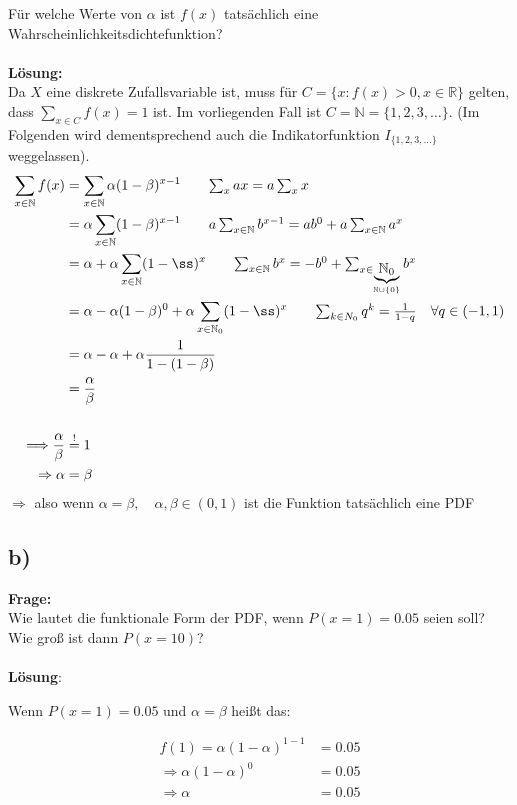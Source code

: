 \documentclass{article}
\begin{document}
Für welche Werte von $\alpha$ ist $f(x)$ tatsächlich eine Wahrscheinlichkeitsdichtefunktion?\\ \\
\textbf{Lösung:} \\

Da $X$ eine diskrete Zufallsvariable ist, muss für $C = \{x: f(x) > 0, x \in \mathbb{R}\}$ gelten, dass $\sum_{x \in C}f(x) = 1$ ist. Im vorliegenden Fall ist $C = \mathbb{N} = \{1,2,3, \ldots\}$. (Im Folgenden wird dementsprechend auch die Indikatorfunktion $I_{\{1,2,3,...\}}$ weggelassen).
\begin{align*}
    \sum_{x \in \mathbb{N}} f(x) &= \sum_{x \in \mathbb{N}}\alpha (1-\beta)^{x-1} \tag*{$\sum_{x} ax = a \sum_{x}x$} \\
    &= \alpha \sum_{x \in \mathbb{N}} (1-\beta)^{x-1} \tag*{$a\sum_{x \in \mathbb{N}}b^{x-1}= ab^{0} + a\sum_{x \in \mathbb{N}}a^{x}$} \\
    &= \alpha + \alpha \sum_{x \in \mathbb{N}}(1-ß)^{x} \tag*{$\sum_{x \in \mathbb{N}} b^{x} = -b^{0} +\sum_{x \in \underbrace{\mathbb{N}_{0}}_{\mathbb{N}\cup \{ 0 \}}} b^{x}$}  \\
    &= \alpha - \alpha(1-\beta)^{0} + \alpha \sum_{x \in \mathbb{N}_{0}}(1-ß)^{x} \tag*{$\sum_{k \in N_{0}} q^{k} = \frac{1}{1-q}\quad \forall q \in (-1, 1)$} \\
    &= \alpha - \alpha  + \alpha \frac{1}{1- ( 1 - \beta)} \\
    &= \frac{\alpha}{\beta} \\ \\
    \Longrightarrow \frac{\alpha}{\beta} &\overset{!}{=} 1 \\
    \Rightarrow \alpha &= \beta 
\end{align*}
$\Longrightarrow$ also wenn $\alpha = \beta, \quad \alpha, \beta \in (0,1)$ ist die Funktion tatsächlich eine PDF 

\subsection*{b)}
\textbf{Frage:}\\

Wie lautet die funktionale Form der PDF, wenn $P(x=1)=0.05$ seien soll? Wie groß ist dann $P(x = 10)$? \\\\ 
\textbf{Lösung}:

Wenn $P(x=1)=0.05$ und $\alpha = \beta$ heißt das: 

\begin{align*}
    f(1) = \alpha(1-\alpha)^{1-1}&= 0.05 \\
    \Rightarrow \alpha(1-\alpha)^{0} &= 0.05 \\ 
    \Rightarrow \alpha &= 0.05
\end{align*}
\end{document}
